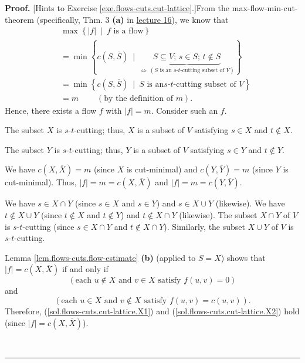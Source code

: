 \documentclass[numbers=enddot,12pt,final,onecolumn,notitlepage]{scrartcl}%
\theoremstyle{definition}
\newenvironment{proof}[1][Proof]{\noindent\textbf{#1.} }{\ \rule{0.5em}{0.5em}}
\begin{document}
\begin{proof}
[Hints to Exercise \ref{exe.flows-cuts.cut-lattice}.]From the
max-flow-min-cut-theorem (specifically, Thm. 3 \textbf{(a)} in
\href{http://www-users.math.umn.edu/~dgrinber/5707s17/5707lec16.pdf}{lecture
16}), we know that%
\begin{align*}
&  \max\left\{  \left\vert f\right\vert \ \mid\ f\text{ is a flow}\right\} \\
&  =\min\left\{  c\left(  S,\overline{S}\right)  \ \mid
\ \underbrace{S\subseteq V\text{; }s\in S\text{; }t\notin S}%
_{\Longleftrightarrow\ \left(  S\text{ is an }s\text{-}t\text{-cutting subset
of }V\right)  }\right\} \\
&  =\min\left\{  c\left(  S,\overline{S}\right)  \ \mid\ S\text{ is an
}s\text{-}t\text{-cutting subset of }V\right\} \\
&  =m\ \ \ \ \ \ \ \ \ \ \left(  \text{by the definition of }m\right)  .
\end{align*}
Hence, there exists a flow $f$ with $\left\vert f\right\vert =m$. Consider
such an $f$.

The subset $X$ is $s$-$t$-cutting; thus, $X$ is a subset of $V$ satisfying
$s\in X$ and $t\notin X$.

The subset $Y$ is $s$-$t$-cutting; thus, $Y$ is a subset of $V$ satisfying
$s\in Y$ and $t\notin Y$.

We have $c\left(  X,\overline{X}\right)  =m$ (since $X$ is cut-minimal) and
$c\left(  Y,\overline{Y}\right)  =m$ (since $Y$ is cut-minimal). Thus,
$\left\vert f\right\vert =m=c\left(  X,\overline{X}\right)  $ and $\left\vert
f\right\vert =m=c\left(  Y,\overline{Y}\right)  $.

We have $s\in X\cap Y$ (since $s\in X$ and $s\in Y$) and $s\in X\cup Y$
(likewise). We have $t\notin X\cup Y$ (since $t\notin X$ and $t\notin Y$) and
$t\notin X\cap Y$ (likewise). The subset $X\cap Y$ of $V$ is $s$-$t$-cutting
(since $s\in X\cap Y$ and $t\notin X\cap Y$). Similarly, the subset $X\cup Y$
of $V$ is $s$-$t$-cutting.

Lemma \ref{lem.flows-cuts.flow-estimate} \textbf{(b)} (applied to $S=X$) shows
that $\left\vert f\right\vert =c\left(  X,\overline{X}\right)  $ if and only
if
\begin{equation}
\left(  \text{each }u\notin X\text{ and }v\in X\text{ satisfy }f\left(
u,v\right)  =0\right)  \label{sol.flows-cuts.cut-lattice.X1}%
\end{equation}
and%
\begin{equation}
\left(  \text{each }u\in X\text{ and }v\notin X\text{ satisfy }f\left(
u,v\right)  =c\left(  u,v\right)  \right)  .
\label{sol.flows-cuts.cut-lattice.X2}%
\end{equation}
Therefore, (\ref{sol.flows-cuts.cut-lattice.X1}) and
(\ref{sol.flows-cuts.cut-lattice.X2}) hold (since $\left\vert f\right\vert
=c\left(  X,\overline{X}\right)  $).


\end{proof}
\end{document}
